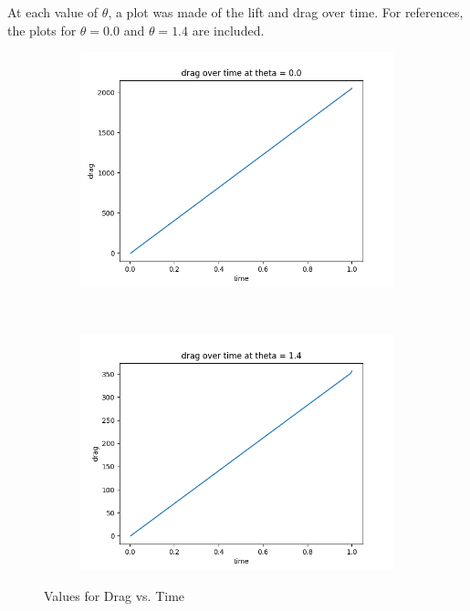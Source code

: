 \documentclass[12pt]{article}
\theoremstyle{definition}
\numberwithin{equation}{section}
\begin{document}
	 At each value of $\theta$, a plot was made of the lift and drag over time. For references, the plots for $\theta = 0.0$ and $\theta = 1.4$ are included.
	\begin{figure}[H]
		\centering
		\begin{subfigure}[t]{0.5\textwidth}
			\centering
			\includegraphics[scale=0.5]{../lift_and_drag/drag_0_0.png}
		\end{subfigure}%
		~ 
		\begin{subfigure}[t]{0.5\textwidth}
			\centering
			\includegraphics[scale=0.5]{../lift_and_drag/drag_1_4.png}
		\end{subfigure}
		\caption{Values for Drag vs. Time}
	\end{figure}
\end{document}
